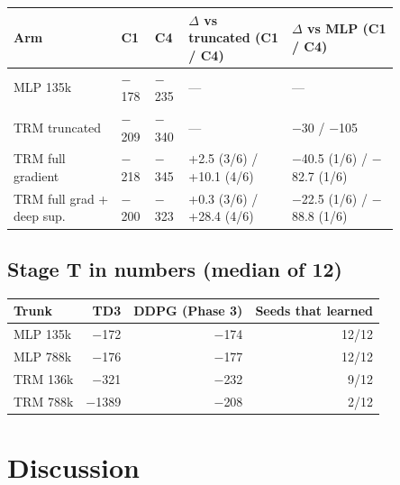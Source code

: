\documentclass[11pt]{article}
\begin{document}
\begin{center}\small\begin{tabular}{>{\raggedright\arraybackslash}p{0.253\linewidth}>{\raggedleft\arraybackslash}p{0.050\linewidth}>{\raggedleft\arraybackslash}p{0.050\linewidth}>{\raggedright\arraybackslash}p{0.243\linewidth}>{\raggedright\arraybackslash}p{0.253\linewidth}}
\toprule
Arm & C1 & C4 & $\Delta$ vs truncated (C1 / C4) & $\Delta$ vs MLP (C1 / C4) \\
\midrule
MLP 135k & $-$178 & $-$235 & --- & --- \\
TRM truncated & $-$209 & $-$340 & --- & $-$30 / $-$105 \\
TRM full gradient & $-$218 & $-$345 & +2.5 (3/6) / +10.1 (4/6) & $-$40.5 (1/6) / $-$82.7 (1/6) \\
TRM full grad + deep sup. & $-$200 & $-$323 & +0.3 (3/6) / +28.4 (4/6) & $-$22.5 (1/6) / $-$88.8 (1/6) \\
\bottomrule
\end{tabular}\end{center}



\subsection*{Stage T in numbers (median of 12)}



\begin{center}\begin{tabular}{lrrr}
\toprule
Trunk & TD3 & DDPG (Phase 3) & Seeds that learned \\
\midrule
MLP 135k & $-$172 & $-$174 & 12/12 \\
MLP 788k & $-$176 & $-$177 & 12/12 \\
TRM 136k & $-$321 & $-$232 & 9/12 \\
TRM 788k & $-$1389 & $-$208 & 2/12 \\
\bottomrule
\end{tabular}\end{center}



\section*{Discussion}
\end{document}
